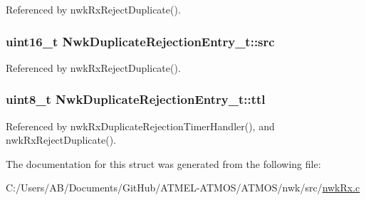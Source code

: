 Referenced by nwk\-Rx\-Reject\-Duplicate().

\hypertarget{struct_nwk_duplicate_rejection_entry__t_a63239398cdce980e8fdb8ddcc3b355e4}{
\subsubsection[{src}]{\setlength{\rightskip}{0pt plus 5cm}uint16\-\_\-t Nwk\-Duplicate\-Rejection\-Entry\-\_\-t\-::src}}\label{struct_nwk_duplicate_rejection_entry__t_a63239398cdce980e8fdb8ddcc3b355e4}


Referenced by nwk\-Rx\-Reject\-Duplicate().

\hypertarget{struct_nwk_duplicate_rejection_entry__t_a05c493a205d4e7c456c7e6da52fa4f34}{
\subsubsection[{ttl}]{\setlength{\rightskip}{0pt plus 5cm}uint8\-\_\-t Nwk\-Duplicate\-Rejection\-Entry\-\_\-t\-::ttl}}\label{struct_nwk_duplicate_rejection_entry__t_a05c493a205d4e7c456c7e6da52fa4f34}


Referenced by nwk\-Rx\-Duplicate\-Rejection\-Timer\-Handler(), and nwk\-Rx\-Reject\-Duplicate().



The documentation for this struct was generated from the following file\-:\begin{DoxyCompactItemize}
\item 
C\-:/\-Users/\-A\-B/\-Documents/\-Git\-Hub/\-A\-T\-M\-E\-L-\/\-A\-T\-M\-O\-S/\-A\-T\-M\-O\-S/nwk/src/\hyperlink{nwk_rx_8c}{nwk\-Rx.\-c}\end{DoxyCompactItemize}
